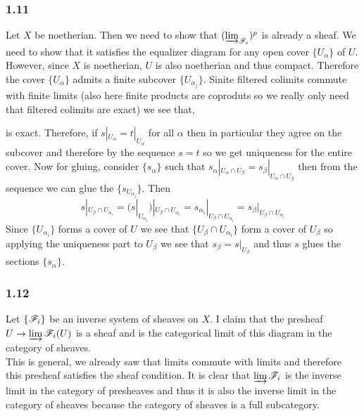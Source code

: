 \documentclass[12pt]{article}
\begin{document}
\subsubsection{1.11}

Let $X$ be noetherian. Then we need to show that $(\varinjlim_{\mathscr{F}_i})^p$ is already a sheaf. We need to show that it satisfies the equalizer diagram for any open cover $\{ U_\alpha \}$ of $U$. However, since $X$ is noetherian, $U$ is also noetherian and thus compact. Therefore the cover $\{ U_\alpha \}$ admits a finite subcover $\{ U_{\alpha_j} \}$. Sinite filtered colimits commute with finite limits (also here finite products are coproduts so we really only need that filtered colimits are exact) we see that,
\begin{center}
\end{center}
is exact. Therefore, if $s|_{U_{\alpha}} = t|_{U_{\alpha}}$ for all $\alpha$ then in particular they agree on the subcover and therefore by the sequence $s = t$ so we get uniqueness for the entire cover. Now for gluing, consider $\{ s_{\alpha} \}$ such that $s_{\alpha}|_{U_\alpha \cap U_\beta} = s_{\beta} |_{U_\alpha \cap U_\beta}$ then from the sequence we can glue the $\{ s_{U_{\alpha_j}} \}$. Then 
\[ s|_{{U_\beta} \cap U_{\alpha_i}} = (s|_{U_{\alpha_i}})|_{U_{\beta} \cap U_{\alpha_i}} = s_{\alpha_i} |_{U_{\beta} \cap U_{\alpha_i}} = s_{\beta} |_{U_{\beta} \cap U_{\alpha_i}} \]
Since $\{ U_{\alpha_i} \}$ forms a cover of $U$ we see that $\{ U_\beta \cap U_{\alpha_i} \}$ form a cover of $U_\beta$ so applying the uniqueness part to $U_\beta$ we see that $s_\beta = s|_{U_\beta}$ and thus $s$ glues the sections $\{ s_\alpha \}$.

\subsubsection{1.12}

Let $\{ \mathscr{F}_i \}$ be an inverse system of sheaves on $X$. I claim that the presheaf $U \to \varinjlim \mathscr{F}_i(U)$ is a sheaf and is the categorical limit of this diagram in the category of sheaves.
\bigskip\\
This is general, we already saw that limits commute with limits and therefore this presheaf satisfies the sheaf condition. It is clear that $\varinjlim \mathscr{F}_i$ is the inverse limit in the category of presheaves and thus it is also the inverse limit in the category of sheaves because the category of sheaves is a full subcategory. 
\end{document}
